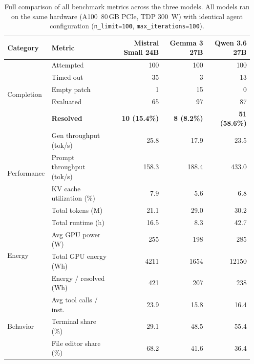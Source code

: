 \documentclass[10pt,twocolumn]{article}
\begin{document}
\begin{table}[t]
  \centering
  \caption{Full comparison of all benchmark metrics across the three
           models. All models ran on the same hardware
           (A100~80\,GB PCIe, TDP \SI{300}{\watt}) with identical
           agent configuration (\texttt{n\_limit=100},
           \texttt{max\_iterations=100}).}
  \label{tab:full_comparison}
  \small
  \begin{tabular}{@{}llrrr@{}}
    \toprule
    \textbf{Category} & \textbf{Metric}
      & \textbf{Mistral Small 24B} & \textbf{Gemma 3 27B}
      & \textbf{Qwen 3.6 27B} \\
    \midrule
    \multirow{5}{*}{Completion}
      & Attempted              & 100        & 100        & 100         \\
      & Timed out              &  35        &   3        &  13         \\
      & Empty patch            &   1        &  15        &   0         \\
      & Evaluated              &  65        &  97        &  87         \\
      & \textbf{Resolved}      & \textbf{10 (15.4\%)} & \textbf{8 (8.2\%)}
                               & \textbf{51 (58.6\%)}               \\
    \midrule
    \multirow{4}{*}{Performance}
      & Gen throughput (tok/s)    & 25.8     & 17.9     & 23.5       \\
      & Prompt throughput (tok/s) & 158.3    & 188.4    & 433.0      \\
      & KV cache utilization (\%) & 7.9      &  5.6     &  6.8       \\
      & Total tokens (M)          & 21.1     & 29.0     & 30.2       \\
    \midrule
    \multirow{4}{*}{Energy}
      & Total runtime (h)        & 16.5     &  8.3     & 42.7       \\
      & Avg GPU power (W)        & 255      & 198      & 285        \\
      & Total GPU energy (Wh)    & \num{4211} & \num{1654} & \num{12150} \\
      & Energy / resolved (Wh)   & 421      & 207      & 238        \\
    \midrule
    \multirow{3}{*}{Behavior}
      & Avg tool calls / inst.   & 23.9     & 15.8     & 16.4       \\
      & Terminal share (\%)      & 29.1     & 48.5     & 55.4       \\
      & File editor share (\%)   & 68.2     & 41.6     & 36.4       \\

\end{tabular}
\end{table}
\end{document}
